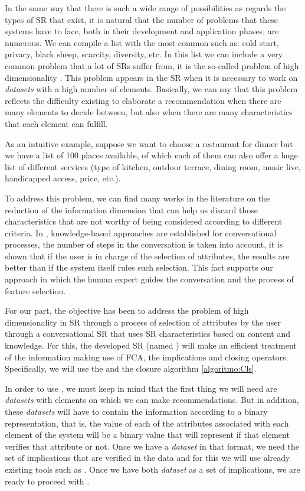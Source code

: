 In the same way that there is such a wide range of possibilities as regards the types of SR that exist, it is natural that the number of problems that these systems have to face, both in their development and application phases, are numerous. We can compile a list with the most common such as: cold start, privacy, black sheep, scarcity, diversity, etc. In this list we can include a very common problem that a lot of SRs suffer from, it is the so-called problem of high dimensionality \cite{Salimi2017, Nagler2016}. This problem appears in the SR when it is necessary to work on \textit{datasets} with a high number of elements. Basically, we can say that this problem reflects the difficulty existing to elaborate a recommendation when there are many elements to decide between, but also when there are many characteristics that each element can fulfill.

As an intuitive example, suppose we want to choose a restaurant for dinner but we have a list of 100 places available, of which each of them can also offer a huge list of different services (type of kitchen, outdoor terrace, dining room, music live, handicapped access, price, etc.).

To address this problem, we can find many works in the literature on the reduction of the information dimension that can help us discard those characteristics that are not worthy of being considered according to different criteria. In \cite{Chen2007,Jannach2009,TrabelsiWBR11}, knowledge-based approaches are established for conversational processes, the number of steps in the conversation is taken into account, it is shown that if the user is in charge of the selection of attributes, the results are better than if the system itself rules such selection. This fact supports our approach in which the human expert guides the conversation and the process of feature selection.

For our part, the objective has been to address the problem of high dimensionality in SR through a process of selection of attributes by the user through a conversational SR that uses SR characteristics based on content and knowledge. For this, the developed SR (named \rs) will make an efficient treatment of the information making use of FCA, the implications and closing operators. Specifically, we will use the \slfde \cite{Enciso2002} and the closure algorithm \ref{algoritmo:Cls}.

\vspace{0.3cm}


In order to use \rs, we must keep in mind that the first thing we will need are \textit{datasets} with elements on which we can make recommendations. But in addition, these \textit{datasets} will have to contain the information according to a binary representation, that is, the value of each of the attributes associated with each element of the system will be a binary value that will represent if that element verifies that attribute or not. Once we have a \textit{dataset} in that format, we need the set of implications that are verified in the data and for this we will use already existing tools such as \cite{HuhtalaKPT99, YaoHB2002, Yevtushenko2006}. Once we have both \textit{dataset} as a set of implications, we are ready to proceed with \rs.

